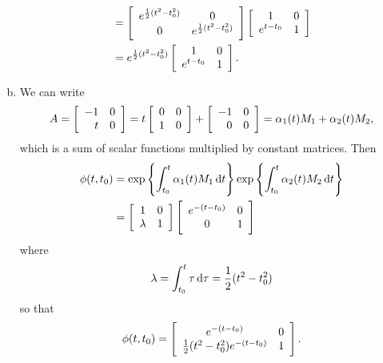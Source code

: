 \documentclass{article}
\begin{document}
\begin{enumerate}[(a)]
{\begin{align*}
    &=
    \left[\begin{array}{c c}
      e^{\frac{1}{2}(t^2 - t_0^2)} & 0 \\
      0                      & e^{\frac{1}{2}(t^2 - t_0^2)}
    \end{array}\right]
    \left[\begin{array}{c c}
      1         & 0 \\
      e^{t - t_0} & 1
    \end{array}\right] \\
    &=
    e^{\frac{1}{2}(t^2 - t_0^2)}
    \left[\begin{array}{c c}
      1         & 0 \\
      e^{t - t_0} & 1
    \end{array}\right].
    \end{align*}
  }
  \item{
    We can write
    $$
    A =
    \left[\begin{array}{r r}
     -1 & 0 \\
      t & 0
    \end{array}\right]
    =
    t
    \left[\begin{array}{c c}
      0 & 0 \\
      1 & 0
    \end{array}\right]
    +
    \left[\begin{array}{r r}
     -1 & 0 \\
      0 & 0
    \end{array}\right]
    =
    \alpha_1(t) M_1 + \alpha_2(t) M_2,
    $$
    which is a sum of scalar functions multiplied by constant
    matrices. Then
    \begin{align*}
      \phi(t, t_0)
      &=
      \exp \left\{
        \int_{t_0}^{t} \alpha_1(t) M_1 \dif t
      \right\}
      \exp \left\{
        \int_{t_0}^{t} \alpha_2(t) M_2 \dif t
      \right\} \\
      &=
      \left[\begin{array}{c c}
        1       & 0 \\
        \lambda & 1
      \end{array}\right]
      \left[\begin{array}{c c}
        e^{-(t - t_0)} & 0 \\
        0           & 1
      \end{array}\right]
    \end{align*}
    where
    $$
    \lambda = \int_{t_0}^t \tau \dif \tau = \frac{1}{2}(t^2 - t_0^2)
    $$
    so that
    $$
    \phi(t, t_0) =
    \left[\begin{array}{c c}
      e^{-(t - t_0)}                         & 0 \\
      \frac{1}{2}(t^2 - t_0^2) e^{-(t - t_0)} & 1
    \end{array}\right].
    $$
  }
\end{enumerate}
\end{document}
